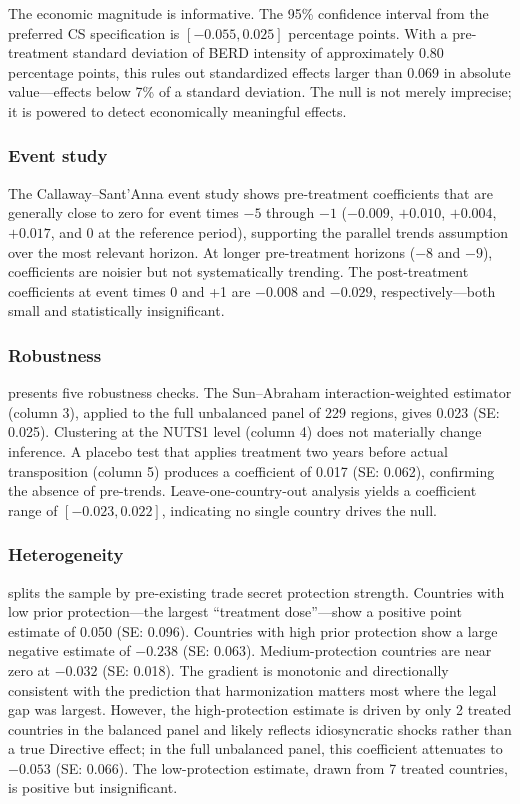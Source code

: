 \documentclass[12pt]{article}
\begin{document}


The economic magnitude is informative. The 95\% confidence interval from the preferred CS specification is $[-0.055, 0.025]$ percentage points. With a pre-treatment standard deviation of BERD intensity of approximately 0.80 percentage points, this rules out standardized effects larger than 0.069 in absolute value---effects below 7\% of a standard deviation. The null is not merely imprecise; it is powered to detect economically meaningful effects.

\subsubsection*{Event study} The Callaway--Sant'Anna event study shows pre-treatment coefficients that are generally close to zero for event times $-5$ through $-1$ ($-0.009$, $+0.010$, $+0.004$, $+0.017$, and 0 at the reference period), supporting the parallel trends assumption over the most relevant horizon. At longer pre-treatment horizons ($-8$ and $-9$), coefficients are noisier but not systematically trending. The post-treatment coefficients at event times 0 and +1 are $-0.008$ and $-0.029$, respectively---both small and statistically insignificant.

\subsubsection*{Robustness}  presents five robustness checks. The Sun--Abraham interaction-weighted estimator (column 3), applied to the full unbalanced panel of 229 regions, gives 0.023 (SE: 0.025). Clustering at the NUTS1 level (column 4) does not materially change inference. A placebo test that applies treatment two years before actual transposition (column 5) produces a coefficient of 0.017 (SE: 0.062), confirming the absence of pre-trends. Leave-one-country-out analysis yields a coefficient range of $[-0.023, 0.022]$, indicating no single country drives the null.



\subsubsection*{Heterogeneity}  splits the sample by pre-existing trade secret protection strength. Countries with low prior protection---the largest ``treatment dose''---show a positive point estimate of 0.050 (SE: 0.096). Countries with high prior protection show a large negative estimate of $-0.238$ (SE: 0.063). Medium-protection countries are near zero at $-0.032$ (SE: 0.018). The gradient is monotonic and directionally consistent with the prediction that harmonization matters most where the legal gap was largest. However, the high-protection estimate is driven by only 2 treated countries in the balanced panel and likely reflects idiosyncratic shocks rather than a true Directive effect; in the full unbalanced panel, this coefficient attenuates to $-0.053$ (SE: 0.066). The low-protection estimate, drawn from 7 treated countries, is positive but insignificant.
\end{document}
